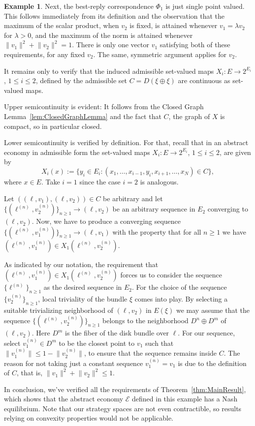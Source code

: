 \documentclass[a4paper,11pt,reqno,english]{amsart}
\theoremstyle{definition}
\newtheorem{example}[theorem]{Example}
\begin{document}
\begin{example}
	Next, the best-reply correspondence $\Phi_1$ is just single point valued.
	This follows immediately from its definition and the observation that the maximum of the scalar product, when $v_2$ is fixed, is attained whenever $v_1 =\lambda v_2$ for $\lambda > 0$, and the maximum of the norm is attained whenever $\lVert v_1 \rVert^2 + \lVert v_2 \rVert^2 = 1$.
	There is only one vector $v_1$ satisfying both of these requirements, for any fixed $v_2$. The same, symmetric argument applies for $v_2$.

	It remains only to verify that the induced admissible set-valued maps $X_i\colon E\longrightarrow 2^{E_i}$, $1\leq i \leq 2$, defined by the admissible set $C = D(\xi\oplus \xi)$ are continuous as set-valued maps.

	Upper semicontinuity is evident: It follows from the Closed Graph Lemma~\ref{lem:ClosedGraphLemma} and the fact that $C$, the graph of $X$ is compact, so in particular closed.

	Lower semicontinuity is verified by definition. For that, recall that in an abstract economy in admissible form the set-valued maps $X_i\colon E\longrightarrow 2^{E_i}$, $1\leq i \leq 2$, are given by
	\[
		X_i(x):= \{y_i\in E_i\colon (x_1,\dots,x_{i-1}, y_i, x_{i+1}, \dots, x_N)\in C\},
	\]
	where $x\in E$.
	Take $i=1$ since the case $i=2$ is analogous.


	Let $((\ell, v_1), (\ell, v_2)) \in C$ be arbitrary and let $\{(\ell^{(n)}, v_2^{(n)})\}_{n\geq 1} \to (\ell, v_2)$ be an arbitrary sequence in $E_2$ converging to $(\ell, v_2)$.
	Now, we have to produce a converging sequence $\{(\ell^{(n)}, v_1^{(n)})\}_{n\geq 1} \to (\ell, v_1)$ with the property that for all $n\geq 1$ we have $(\ell^{(n)}, v_1^{(n)})\in X_1(\ell^{(n)}, v_2^{(n)})$.

	As indicated by our notation, the requirement that $(\ell^{(n)}, v_1^{(n)})\in X_1(\ell^{(n)}, v_2^{(n)})$ forces us to consider the  sequence $\{\ell^{(n)}\}_{n\geq 1}$ as the desired sequence in $E_2$.
	For the choice of the sequence $\{v_2^{(n)}\}_{n\geq 1}$, local triviality of the bundle $\xi$ comes into play.
	By selecting a suitable trivializing neighborhood of $(\ell, v_2)$ in $E(\xi)$ we may assume that the  sequence $\{(\ell^{(n)}, v_2^{(n)})\}_{n\geq 1}$ belongs to the neighborhood $D^n\oplus D^m$ of  $(\ell, v_2)$.
	Here $D^m$ is the fiber of the disk bundle over $\ell$.
	For our sequence, select $v_1^{(n)}\in D^m$ to be the closest point to $v_1$ such that $\lVert v_1^{(n)}\rVert \leq 1-\lVert v_2^{(n)}\rVert$, to ensure that the sequence remains inside $C$. The reason for not taking just a constant sequence $v_1^{(n)}=v_1$ is due to the definition of $C$, that is, $ \lVert v_1 \rVert^2 + \lVert v_2 \rVert^2 \leq 1$.

	\medskip
	In conclusion, we've verified all the requirements of Theorem~\ref{thm:MainResult}, which shows that the abstract economy $\mathcal{E}$ defined in this example has a Nash equilibrium. Note that our strategy spaces are not even contractible, so results relying on convexity properties would not be applicable.
\end{example}
\end{document}
